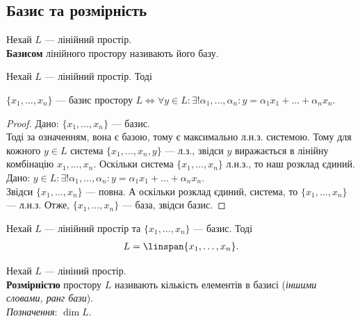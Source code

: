 \documentclass{math_library}
\begin{document}
	\subsection{Базис та розмірність}
	\begin{definition}
	Нехай $L$ --- лінійний простір.\\
	\textbf{Базисом} лінійного простору називають його базу.
	\end{definition}
	
	\begin{theorem}
	\label{basis_iff_uniquely_decomposed_as_combination}
	Нехай $L$ --- лінійний простір. Тоді
	\begin{center}
	$\{x_1,\dots,x_n\}$ --- базис простору $L \iff \forall y \in L: \exists! \alpha_1, \dots, \alpha_n: y = \alpha_1 x_1 + \dots + \alpha_n x_n$. 
	\end{center}
	\end{theorem}
	
	\begin{proof}
	\rightproof Дано: $\{x_1,\dots,x_n\}$ --- базис.\\
	Тоді за означенням, вона є базою, тому є максимально л.н.з. системою. Тому для кожного $y \in L$ система $\{x_1,\dots,x_n,y\}$ --- л.з., звідси $y$ виражається в лінійну комбінацію $x_1,\dots,x_n$. Оскільки система $\{x_1,\dots,x_n\}$ л.н.з., то наш розклад єдиний.
	\bigskip \\
	\leftproof Дано: $y \in L: \exists! \alpha_1, \dots, \alpha_n: y = \alpha_1 x_1 + \dots + \alpha_n x_n$.\\
	Звідси $\{x_1,\dots,x_n\}$ --- повна. А оскільки розклад єдиний, система, то $\{x_1,\dots,x_n\}$ --- л.н.з. Отже, $\{x_1,\dots,x_n\}$ --- база, звідси базис.
	\end{proof}
	
	\begin{corollary}
	Нехай $L$ --- лінійний простір та $\{x_1,\dots,x_n\}$ --- базис. Тоді
	\begin{align*}
	L = \linspan\{x_1,\dots,x_n\}.
	\end{align*}
	\end{corollary}
	
	\begin{definition}
	Нехай $L$ --- лініний простір.\\
	\textbf{Розмірністю} простору $L$ називають кількість елементів в базисі (\textit{іншими словами, ранг бази}).\\
	\textit{Позначення}: $\dim L$.
	\end{definition}
	
\end{document}
